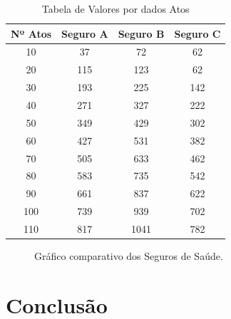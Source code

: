 \documentclass{report}
\begin{document}
\begin{table}[h]
  \centering
  \begin{tabular}{|c|c|c|c|}
    \hline
    Nº Atos & Seguro A & Seguro B & Seguro C \\
    \hline
    10 & 37 & 72 & 62 \\ \hline
    20 & 115 & 123 & 62 \\ \hline
    30 & 193 & 225 & 142 \\ \hline
    40 & 271 & 327 & 222 \\ \hline
    50 & 349 & 429 & 302 \\ \hline
    60 & 427 & 531 & 382 \\ \hline
    70 & 505 & 633 & 462 \\ \hline
    80 & 583 & 735 & 542 \\ \hline
    90 & 661 & 837 & 622 \\ \hline
    100 & 739 & 939 & 702 \\ \hline
    110 & 817 & 1041 & 782 \\
    \hline
  \end{tabular}
  \caption{Tabela de Valores por dados Atos}
  \label{tab:valores}
\end{table}

\begin{figure}[H]
  \begin{center}
  \end{center}
  \caption{Gráfico comparativo dos Seguros de Saúde.}
  \label{fig:comparison}
\end{figure}

\chapter{Conclusão}
\end{document}
